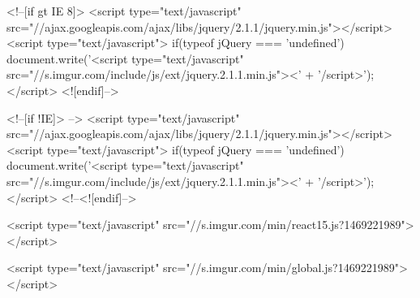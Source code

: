 <!--[if gt IE 8]>
<script type="text/javascript" src="//ajax.googleapis.com/ajax/libs/jquery/2.1.1/jquery.min.js"></script>
<script type="text/javascript">
if(typeof jQuery === 'undefined') {
    document.write('<script type="text/javascript" src="//s.imgur.com/include/js/ext/jquery.2.1.1.min.js"><' + '/script>');
}
</script>
<![endif]-->

<!--[if !IE]> -->
<script type="text/javascript" src="//ajax.googleapis.com/ajax/libs/jquery/2.1.1/jquery.min.js"></script>
<script type="text/javascript">
if(typeof jQuery === 'undefined') {
    document.write('<script type="text/javascript" src="//s.imgur.com/include/js/ext/jquery.2.1.1.min.js"><' + '/script>');
}
</script>
<!--<![endif]-->



                    <script type="text/javascript" src="//s.imgur.com/min/react15.js?1469221989"></script>

        
        <script type="text/javascript" src="//s.imgur.com/min/global.js?1469221989"></script>

